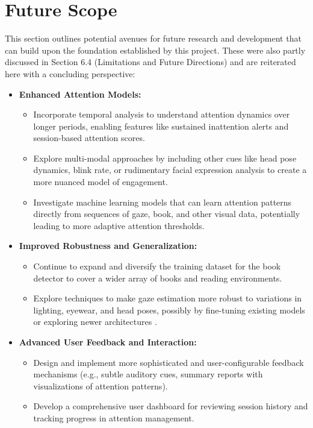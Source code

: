 \section{Future Scope }
This section outlines potential avenues for future research and development that can build upon the foundation established by this project. These were also partly discussed in Section 6.4 (Limitations and Future Directions) and are reiterated here with a concluding perspective:
\begin{itemize}
    \item \textbf{Enhanced Attention Models:}
    \begin{itemize}
        \item Incorporate temporal analysis to understand attention dynamics over longer periods, enabling features like sustained inattention alerts and session-based attention scores.
        \item Explore multi-modal approaches by including other cues like head pose dynamics, blink rate, or rudimentary facial expression analysis to create a more nuanced model of engagement.
        \item Investigate machine learning models that can learn attention patterns directly from sequences of gaze, book, and other visual data, potentially leading to more adaptive attention thresholds.
    \end{itemize}
    \item \textbf{Improved Robustness and Generalization:}
    \begin{itemize}
        \item Continue to expand and diversify the training dataset for the book detector to cover a wider array of books and reading environments.
        \item Explore techniques to make gaze estimation more robust to variations in lighting, eyewear, and head poses, possibly by fine-tuning existing models or exploring newer architectures \cite{Kothari_GazeReviewDL_2024}.
    \end{itemize}
    \item \textbf{Advanced User Feedback and Interaction:}
    \begin{itemize}
        \item Design and implement more sophisticated and user-configurable feedback mechanisms (e.g., subtle auditory cues, summary reports with visualizations of attention patterns).
        \item Develop a comprehensive user dashboard for reviewing session history and tracking progress in attention management.

\end{itemize}
\end{itemize}
